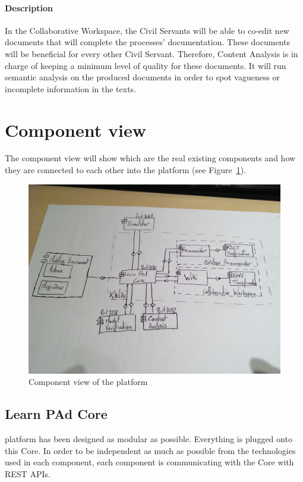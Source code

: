 \documentclass{learnpad}
\begin{document}
\paragraph{Description}
In the Collaborative Workspace, the Civil Servants will be able to co-edit new
documents that will complete the processes' documentation.  These documents will
be beneficial for every other Civil Servant.  Therefore, Content Analysis is in
charge of keeping a minimum level of quality for these documents.  It will run
semantic analysis on the produced documents in order to spot vagueness or
incomplete information in the texts.

\section{Component view}
\label{sec:component-view}
The component view will show which are the real existing components and how they
are connected to each other into the \learnpad platform (see
Figure~\ref{fig:component-view}).

\begin{figure}[!htp]
	\centering
	\includegraphics[width=.6\paperwidth,keepaspectratio]{figures/learnpad-architecture.jpg}
	\caption{Component view of the \learnpad platform}
	\label{fig:component-view}
\end{figure}

\subsection{Learn PAd Core}
\learnpad platform has been designed as modular as possible.  Everything is
plugged onto this \learnpad Core.  In order to be independent as much as
possible from the technologies used in each component, each component is
communicating with the \learnpad Core with REST APIs.
\end{document}
